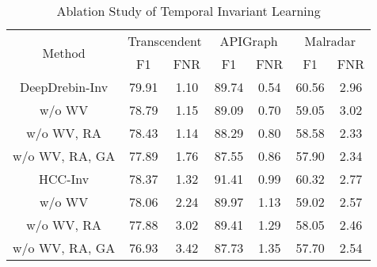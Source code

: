 \begin{table}[htb]
\caption{Ablation Study of Temporal Invariant Learning}
\label{tab: ablation}
\centering
\begin{tabular}{c|cc|cc|cc}
\toprule
\multirow{2}{*}{Method} & \multicolumn{2}{c|}{Transcendent}                  & \multicolumn{2}{c|}{APIGraph}                      & \multicolumn{2}{c}{Malradar}                      \\ \cline{2-7} 
& \multicolumn{1}{c|}{F1}       & \multicolumn{1}{c|}{FNR}        & \multicolumn{1}{c|}{F1}       & \multicolumn{1}{c|}{FNR}      
& \multicolumn{1}{c|}{F1}       & \multicolumn{1}{c}{FNR}      \\ \midrule
DeepDrebin-Inv
& \multicolumn{1}{c|}{79.91} & \multicolumn{1}{c|}{1.10} 
& \multicolumn{1}{c|}{89.74} & \multicolumn{1}{c|}{0.54} 
& \multicolumn{1}{c|}{60.56} & \multicolumn{1}{c}{2.96} \\
\midrule
w/o WV
& \multicolumn{1}{c|}{78.79} & \multicolumn{1}{c|}{1.15} 
& \multicolumn{1}{c|}{89.09} & \multicolumn{1}{c|}{0.70} 
& \multicolumn{1}{c|}{59.05} & \multicolumn{1}{c}{3.02} \\
w/o WV, RA
& \multicolumn{1}{c|}{78.43} & \multicolumn{1}{c|}{1.14} 
& \multicolumn{1}{c|}{88.29} & \multicolumn{1}{c|}{0.80} 
& \multicolumn{1}{c|}{58.58} & \multicolumn{1}{c}{2.33} \\
w/o WV, RA, GA
& \multicolumn{1}{c|}{77.89} & \multicolumn{1}{c|}{1.76} 
& \multicolumn{1}{c|}{87.55} & \multicolumn{1}{c|}{0.86} 
& \multicolumn{1}{c|}{57.90} & \multicolumn{1}{c}{2.34} \\
\midrule
HCC-Inv
& \multicolumn{1}{c|}{78.37} & \multicolumn{1}{c|}{1.32} 
& \multicolumn{1}{c|}{91.41} & \multicolumn{1}{c|}{0.99} 
& \multicolumn{1}{c|}{60.32} & \multicolumn{1}{c}{2.77} \\
\midrule
w/o WV
& \multicolumn{1}{c|}{78.06} & \multicolumn{1}{c|}{2.24} 
& \multicolumn{1}{c|}{89.97} & \multicolumn{1}{c|}{1.13} 
& \multicolumn{1}{c|}{59.02} & \multicolumn{1}{c}{2.57} \\
w/o WV, RA
& \multicolumn{1}{c|}{77.88} & \multicolumn{1}{c|}{3.02} 
& \multicolumn{1}{c|}{89.41} & \multicolumn{1}{c|}{1.29} 
& \multicolumn{1}{c|}{58.05} & \multicolumn{1}{c}{2.46} \\
w/o WV, RA, GA
& \multicolumn{1}{c|}{76.93} & \multicolumn{1}{c|}{3.42} 
& \multicolumn{1}{c|}{87.73} & \multicolumn{1}{c|}{1.35} 
& \multicolumn{1}{c|}{57.70} & \multicolumn{1}{c}{2.54} \\
                      
\bottomrule
\end{tabular}  
\end{table}